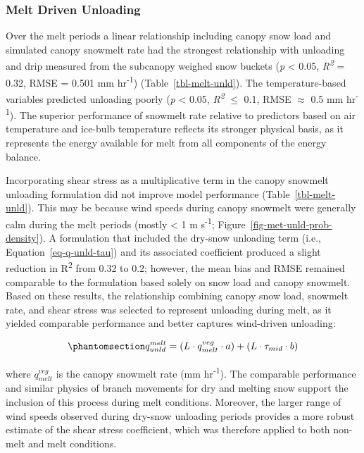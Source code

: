 \documentclass[
]{agujournal2019}
\begin{document}
\subsubsection{Melt Driven Unloading}\label{sec-melt-unld}

Over the melt periods a linear relationship including canopy snow load
and simulated canopy snowmelt rate had the strongest relationship with
unloading and drip measured from the subcanopy weighed snow buckets
(\emph{p} \textless{} 0.05, \emph{R\textsuperscript{2}} = 0.32, RMSE =
0.501 mm hr\textsuperscript{-1}) (Table~\ref{tbl-melt-unld}). The
temperature-based variables predicted unloading poorly (\emph{p}
\textless{} 0.05, \emph{R\textsuperscript{2}} \(\le\) 0.1, RMSE
\(\approx\) 0.5 mm hr\textsuperscript{-1}). The superior performance of
snowmelt rate relative to predictors based on air temperature and
ice-bulb temperature reflects its stronger physical basis, as it
represents the energy available for melt from all components of the
energy balance.

Incorporating shear stress as a multiplicative term in the canopy
snowmelt unloading formulation did not improve model performance
(Table~\ref{tbl-melt-unld}). This may be because wind speeds during
canopy snowmelt were generally calm during the melt periods (mostly
\textless{} 1 m s\textsuperscript{-1};
Figure~\ref{fig-met-unld-prob-density}). A formulation that included the
dry-snow unloading term (i.e., Equation~\ref{eq-q-unld-tau}) and its
associated coefficient produced a slight reduction in
R\textsuperscript{2} from 0.32 to 0.2; however, the mean bias and RMSE
remained comparable to the formulation based solely on snow load and
canopy snowmelt. Based on these results, the relationship combining
canopy snow load, snowmelt rate, and shear stress was selected to
represent unloading during melt, as it yielded comparable performance
and better captures wind-driven unloading:

\begin{equation}\phantomsection\label{eq-q-unld-melt}{
q_{unld}^{melt} = (L \cdot q_{melt}^{veg} \cdot a) + (L \cdot \tau_{mid} \cdot b)
}\end{equation}

where \(q_{melt}^{veg}\) is the canopy snowmelt rate (mm
hr\textsuperscript{-1}). The comparable performance and similar physics
of branch movements for dry and melting snow support the inclusion of
this process during melt conditions. Moreover, the larger range of wind
speeds observed during dry-snow unloading periods provides a more robust
estimate of the shear stress coefficient, which was therefore applied to
both non-melt and melt conditions.
\end{document}
